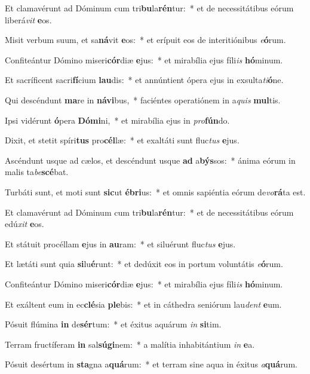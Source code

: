 \item Et clamavérunt ad Dóminum cum tri\textbf{bu}la\textbf{rén}tur:~* et de necessitátibus eórum liberá\textit{vit} \textbf{e}os.
\item Misit verbum suum, et sa\textbf{ná}vit \textbf{e}os:~* et erípuit eos de interitiónibus \textit{e}\textbf{ó}rum.
\item Confiteántur Dómino miseri\textbf{cór}diæ \textbf{e}jus:~* et mirabília ejus fíli\textit{is} \textbf{hó}minum.
\item Et sacríficent sacri\textbf{fí}cium \textbf{lau}dis:~* et annúntient ópera ejus in exsulta\textit{ti}\textbf{ó}ne.
\item Qui descéndunt \textbf{ma}re in \textbf{ná}\textbf{vi}bus,~* faciéntes operatiónem in a\textit{quis} \textbf{mul}tis.
\item Ipsi vidérunt \textbf{ó}pera \textbf{Dó}\textbf{mi}ni,~* et mirabília ejus in \textit{pro}\textbf{fún}do.
\item Dixit, et stetit spíri\textbf{tus} pro\textbf{cél}læ:~* et exaltáti sunt fluc\textit{tus} \textbf{e}jus.
\item Ascéndunt usque ad cælos, et descéndunt usque \textbf{ad} a\textbf{býs}sos:~* ánima eórum in malis ta\textit{be}\textbf{scé}bat.
\item Turbáti sunt, et moti sunt \textbf{sic}ut \textbf{é}\textbf{bri}us:~* et omnis sapiéntia eórum de\textit{vo}\textbf{rá}ta est.
\item Et clamavérunt ad Dóminum cum tri\textbf{bu}la\textbf{rén}tur:~* et de necessitátibus eórum edú\textit{xit} \textbf{e}os.
\item Et státuit procéllam \textbf{e}jus in \textbf{au}ram:~* et siluérunt fluc\textit{tus} \textbf{e}jus.
\item Et lætáti sunt quia \textbf{si}lu\textbf{é}runt:~* et dedúxit eos in portum voluntátis \textit{e}\textbf{ó}rum.
\item Confiteántur Dómino miseri\textbf{cór}diæ \textbf{e}jus:~* et mirabília ejus fíli\textit{is} \textbf{hó}minum.
\item Et exáltent eum in ec\textbf{clé}sia \textbf{ple}bis:~* et in cáthedra seniórum lau\textit{dent} \textbf{e}um.
\item Pósuit flúmina \textbf{in} de\textbf{sér}tum:~* et éxitus aquárum \textit{in} \textbf{si}tim.
\item Terram fructíferam \textbf{in} sal\textbf{sú}\textbf{gi}nem:~* a malítia inhabitántium \textit{in} \textbf{e}a.
\item Pósuit desértum in \textbf{sta}gna a\textbf{quá}rum:~* et terram sine aqua in éxitus \textit{a}\textbf{quá}rum.
